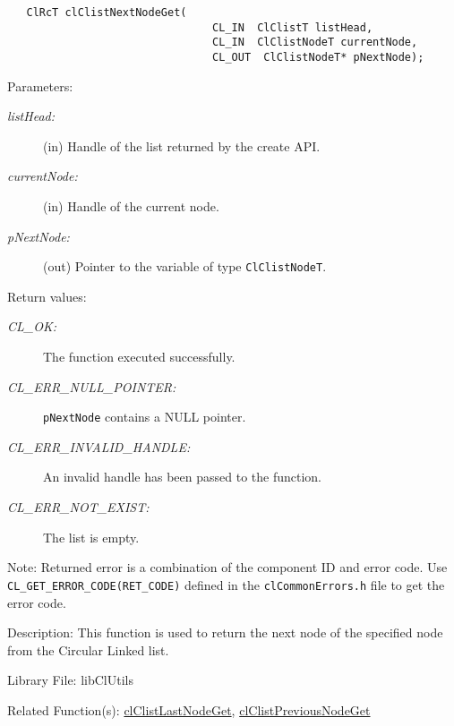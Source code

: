 \begin{flushleft}
\begin{Desc}
\footnotesize\begin{verbatim}   ClRcT clClistNextNodeGet(
                         		CL_IN  ClClistT listHead,
                         		CL_IN  ClClistNodeT currentNode,
                         		CL_OUT  ClClistNodeT* pNextNode);
\end{verbatim}
\normalsize
\end{Desc}
\begin{Desc}
\item[Parameters:]
\begin{description}
\item[{\em list\-Head:}](in) Handle of the list returned by the create API. \item[{\em current\-Node:}](in) Handle of the current node. 
\item[{\em p\-Next\-Node:}](out) Pointer to the variable of type {\tt{Cl\-Clist\-Node\-T}}.\end{description}
\end{Desc}
\begin{Desc}
\item[Return values:]
\begin{description}
\item[{\em CL\_\-OK:}]The function executed successfully. 
\item[{\em CL\_\-ERR\_\-NULL\_\-POINTER:}]{\tt{pNextNode}} contains a NULL pointer. 
\item[{\em CL\_\-ERR\_\-INVALID\_\-HANDLE:}]An invalid handle has been passed to the function. 
\item[{\em CL\_\-ERR\_\-NOT\_\-EXIST:}]The list is empty.\end{description}
\end{Desc}
\begin{Desc}
\item[Note:]Returned error is a combination of the component ID and error code. Use {\tt{CL\_\-GET\_\-ERROR\_\-CODE(RET\_\-CODE)}} defined in 
the {\tt{clCommonErrors.h}} file to get the error code.\end{Desc}
\begin{Desc}
\item[Description:]This function is used to return the next node of the specified node from the Circular Linked list.\end{Desc}
\begin{Desc}
\item[Library File:]lib\-Cl\-Utils\end{Desc}
\begin{Desc}
\item[Related Function(s):]\hyperlink{pagecl108}{cl\-Clist\-Last\-Node\-Get}, \hyperlink{pagecl110}{cl\-Clist\-Previous\-Node\-Get} \end{Desc}
\newpage



\end{flushleft}
